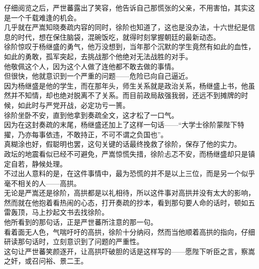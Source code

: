 \begin{multicols}{\theparacolNo}
仔细阅览之后，严世蕃露出了笑容，他告诉自己那慌张的父亲，不用害怕，其实这是一个千载难逢的机会。\\

几乎就在严嵩知晓奏疏内容的同时，徐阶也知道了，这也是没办法，十六世纪是信息的时代，想在保住脑袋，混碗饭吃，就得时刻掌握朝廷的最新动态。\\

徐阶惊叹于杨继盛的勇气，他万没想到，当年那个沉默的学生竟然有如此的血性，如此的勇敢，孤军突起，去挑战那个他绝对无法战胜的对手。\\

他敬佩这个人，因为这个人做了连他都不敢去做的事情。\\

但很快，他就意识到一个严重的问题——危险已向自己逼近。\\

因为杨继盛是他的学生，而在那年头，师生关系就是政治关系，杨继盛上书，他虽然并不知情，却也绝对脱离不了关系。而目前政局敌强我弱，还远不到摊牌的时候，如此时与严党开战，必定功亏一篑。\\

徐阶坐卧不安，直到他拿到奏疏全文，这才松了一口气。\\

因为在这封奏疏的末尾，杨继盛还加上了这样一句话——“大学士徐阶蒙陛下特擢，乃亦每事依违，不敢持正，不可不谓之负国也”。\\

真糊涂也好，假聪明也罢，这句关键的话最终挽救了徐阶，保存了他的实力。\\

政坛的地震看似已经不可避免，严嵩惊慌失措，徐阶忐忑不安，而杨继盛却只是镇定自若，静候处理。\\

不过出人意料的是，在这件事情中，最为恐慌的并不是以上三位，而是另一个似乎毫不相关的人——高拱。\\

无论是严嵩还是徐阶，高拱都是以礼相待，所以这件事对高拱并没有太大的影响，然而就在他抱着看热闹的心态，打开奏疏的抄本，看到那句要人命的话时，顿如五雷轰顶，马上抄起文书去找徐阶。\\

他所看到的那句话，正是严世蕃所注意的那一句。\\

看着面无人色，气喘吁吁的高拱，徐阶十分纳闷，然而当他顺着高拱的指向，仔细研读那句话时，立刻意识到了问题的严重性。\\

这句让严世蕃笑颜逐开，让高拱吓破胆的话是这样写的——愿陛下听臣之言，察嵩之奸，或召问裕、景二王。\\


\end{multicols}
